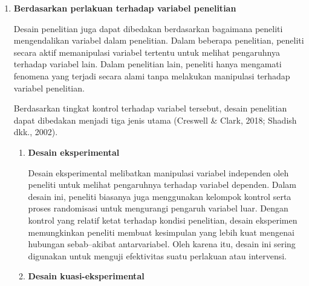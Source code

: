 \documentclass[
  indonesian,
  letterpaper,
  DIV=11,
  numbers=noendperiod]{scrreprt}
\begin{document}
\begin{enumerate}
\begin{enumerate}
    Desain prospektif mempelajari fenomena yang akan terjadi di masa
    depan. Dalam desain ini, peneliti terlebih dahulu mengidentifikasi
    partisipan atau kondisi tertentu, kemudian mengikuti perkembangan
    mereka dalam periode waktu tertentu untuk mengamati perubahan atau
    munculnya fenomena yang diteliti. Pendekatan ini memungkinkan
    peneliti memperoleh data yang lebih sistematis mengenai proses
    terjadinya suatu peristiwa. Namun, penelitian prospektif biasanya
    membutuhkan waktu dan sumber daya yang lebih besar dibandingkan
    penelitian retrospektif (Rothman dkk., 2008).
  \item
    \textbf{Desain retrospektif--prospektif}

    Desain retrospektif--prospektif merupakan kombinasi dari kedua
    pendekatan sebelumnya. Penelitian dimulai dengan menelusuri
    informasi mengenai peristiwa di masa lalu, kemudian dilanjutkan
    dengan pengamatan terhadap perkembangan fenomena tersebut di masa
    depan. Dengan menggabungkan kedua perspektif waktu tersebut,
    peneliti dapat memperoleh gambaran yang lebih lengkap mengenai
    dinamika suatu fenomena.
  \end{enumerate}
\item
  \textbf{Berdasarkan perlakuan terhadap variabel penelitian}

  Desain penelitian juga dapat dibedakan berdasarkan bagaimana peneliti
  mengendalikan variabel dalam penelitian. Dalam beberapa penelitian,
  peneliti secara aktif memanipulasi variabel tertentu untuk melihat
  pengaruhnya terhadap variabel lain. Dalam penelitian lain, peneliti
  hanya mengamati fenomena yang terjadi secara alami tanpa melakukan
  manipulasi terhadap variabel penelitian.

  Berdasarkan tingkat kontrol terhadap variabel tersebut, desain
  penelitian dapat dibedakan menjadi tiga jenis utama (Creswell \&
  Clark, 2018; Shadish dkk., 2002).

  \begin{enumerate}
  \def\labelenumii{\arabic{enumii}.}
  \item
    \textbf{Desain eksperimental}

    Desain eksperimental melibatkan manipulasi variabel independen oleh
    peneliti untuk melihat pengaruhnya terhadap variabel dependen. Dalam
    desain ini, peneliti biasanya juga menggunakan kelompok kontrol
    serta proses randomisasi untuk mengurangi pengaruh variabel luar.
    Dengan kontrol yang relatif ketat terhadap kondisi penelitian,
    desain eksperimen memungkinkan peneliti membuat kesimpulan yang
    lebih kuat mengenai hubungan sebab--akibat antarvariabel. Oleh
    karena itu, desain ini sering digunakan untuk menguji efektivitas
    suatu perlakuan atau intervensi.
  \item
    \textbf{Desain kuasi-eksperimental}


\end{enumerate}
\end{enumerate}
\end{document}
